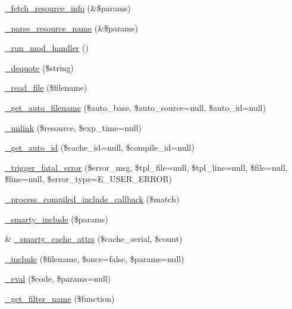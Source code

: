 \begin{DoxyCompactItemize}
\item 
\mbox{\hyperlink{class_smarty_a78b2d264495ae2959a8e67e86bab9e20}{\+\_\+fetch\+\_\+resource\+\_\+info}} (\&\$params)
\item 
\mbox{\hyperlink{class_smarty_ad37ece9f59162066b6b9d592de2f207d}{\+\_\+parse\+\_\+resource\+\_\+name}} (\&\$params)
\item 
\mbox{\hyperlink{class_smarty_ae058bbe121e24a43a4e4b8a51a85e117}{\+\_\+run\+\_\+mod\+\_\+handler}} ()
\item 
\mbox{\hyperlink{class_smarty_a2563e0d1649fe1cd693b9f9ad4ef2f43}{\+\_\+dequote}} (\$string)
\item 
\mbox{\hyperlink{class_smarty_a60429142a4ffd69e86eea341310e2a30}{\+\_\+read\+\_\+file}} (\$filename)
\item 
\mbox{\hyperlink{class_smarty_aba4623a46fe3e54da253ccb89e6cbe12}{\+\_\+get\+\_\+auto\+\_\+filename}} (\$auto\+\_\+base, \$auto\+\_\+source=null, \$auto\+\_\+id=null)
\item 
\mbox{\hyperlink{class_smarty_a40884d76bac2d03fe2e4b88490127684}{\+\_\+unlink}} (\$resource, \$exp\+\_\+time=null)
\item 
\mbox{\hyperlink{class_smarty_ab1a679bb7c98dad1b2d51c41951ada42}{\+\_\+get\+\_\+auto\+\_\+id}} (\$cache\+\_\+id=null, \$compile\+\_\+id=null)
\item 
\mbox{\hyperlink{class_smarty_a2af2bdd132f9c210183775c0bf1c22d9}{\+\_\+trigger\+\_\+fatal\+\_\+error}} (\$error\+\_\+msg, \$tpl\+\_\+file=null, \$tpl\+\_\+line=null, \$file=null, \$line=null, \$error\+\_\+type=E\+\_\+\+U\+S\+E\+R\+\_\+\+E\+R\+R\+OR)
\item 
\mbox{\hyperlink{class_smarty_a4d72ea318875ad16869ec357b3079cdb}{\+\_\+process\+\_\+compiled\+\_\+include\+\_\+callback}} (\$match)
\item 
\mbox{\hyperlink{class_smarty_ac95b8c419b7624569a7bf8fa2ba77f7d}{\+\_\+smarty\+\_\+include}} (\$params)
\item 
\& \mbox{\hyperlink{class_smarty_acc413950cd17c40047c5679f581d5378}{\+\_\+smarty\+\_\+cache\+\_\+attrs}} (\$cache\+\_\+serial, \$count)
\item 
\mbox{\hyperlink{class_smarty_a13f8fe6e3b519a19ba189e21737ac132}{\+\_\+include}} (\$filename, \$once=false, \$params=null)
\item 
\mbox{\hyperlink{class_smarty_ad837e8e78c6f5628cb52f4b69dc1d96c}{\+\_\+eval}} (\$code, \$params=null)
\item 
\mbox{\hyperlink{class_smarty_ace3d50c58e42d8367a550529fea48820}{\+\_\+get\+\_\+filter\+\_\+name}} (\$function)
\end{DoxyCompactItemize}
